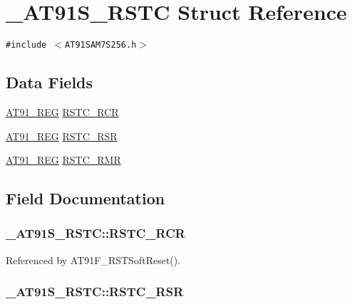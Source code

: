 \hypertarget{struct__AT91S__RSTC}{
\section{\_\-AT91S\_\-RSTC Struct Reference}
\label{struct__AT91S__RSTC}
}
{\tt \#include $<$AT91SAM7S256.h$>$}

\subsection*{Data Fields}
\begin{CompactItemize}
\item 
\hyperlink{AT91SAM7X256_8h_712ad5a1ac1bd02f3e95a7526c283ce1}{AT91\_\-REG} \hyperlink{struct__AT91S__RSTC_43683180657ab3ca1fe46b233b8cbf52}{RSTC\_\-RCR}
\item 
\hyperlink{AT91SAM7X256_8h_712ad5a1ac1bd02f3e95a7526c283ce1}{AT91\_\-REG} \hyperlink{struct__AT91S__RSTC_f5f89e2cc25c4435f046ef4b53d3f298}{RSTC\_\-RSR}
\item 
\hyperlink{AT91SAM7X256_8h_712ad5a1ac1bd02f3e95a7526c283ce1}{AT91\_\-REG} \hyperlink{struct__AT91S__RSTC_94062b99900bea54ab1e8d7bb1295416}{RSTC\_\-RMR}
\end{CompactItemize}


\subsection{Field Documentation}
\hypertarget{struct__AT91S__RSTC_43683180657ab3ca1fe46b233b8cbf52}{
\subsubsection{ {\bf \_\-AT91S\_\-RSTC::RSTC\_\-RCR}}}
\label{struct__AT91S__RSTC_43683180657ab3ca1fe46b233b8cbf52}




Referenced by AT91F\_\-RSTSoftReset().\hypertarget{struct__AT91S__RSTC_f5f89e2cc25c4435f046ef4b53d3f298}{
\subsubsection{ {\bf \_\-AT91S\_\-RSTC::RSTC\_\-RSR}}}
\label{struct__AT91S__RSTC_f5f89e2cc25c4435f046ef4b53d3f298}




